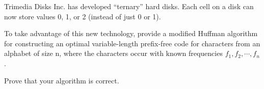 \documentclass[a4paper, justified]{tufte-handout}
\begin{document}
\begin{problem}[TC 17.1-3]
\end{problem}

\begin{solution}
\end{solution}

\begin{problem}[TC 17.2-2]
\end{problem}

\begin{solution}
\end{solution}

\begin{problem}[TC 17.4-1]
\end{problem}

\begin{solution}
\end{solution}

\beginoptional

\begin{problem}
\end{problem}

\begin{solution}
\end{solution}

\beginot
\begin{ot}
	Trimedia Disks Inc. has developed ``ternary'' hard disks. 
	Each cell on a disk can now store values 0, 1, or 2 (instead of just 0 or 1). 
	
	To take advantage of this new technology, provide a modified Huffman
	algorithm for constructing an optimal variable-length prefix-free code for characters from an alphabet of size n, where the characters occur with known frequencies $f_1, f_2, \cdots , f_n$. 
	
	Prove that your algorithm is correct.
\end{ot}

\end{document}
